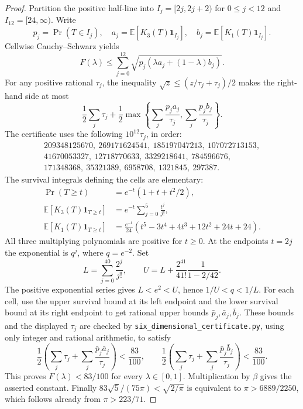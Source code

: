 \documentclass[11pt]{article}
\newcommand{\E}{\mathbb E}
\begin{document}
\begin{proof}
Partition the positive half-line into $I_j=[2j,2j+2)$ for $0\leq j<12$
and $I_{12}=[24,\infty)$. Write
\[
 p_j=\Pr(T\in I_j),\quad
 a_j=\E[K_3(T)\mathbf1_{I_j}],\quad
 b_j=\E[K_1(T)\mathbf1_{I_j}].
\]
Cellwise Cauchy--Schwarz yields
\[
 F(\lambda)\leq\sum_{j=0}^{12}
    \sqrt{p_j(\lambda a_j+(1-\lambda)b_j)}.
\]
For any positive rational $\tau_j$, the inequality
$\sqrt z\leq(z/\tau_j+\tau_j)/2$ makes the right-hand side at most
\[
 \frac12\sum_j\tau_j+
 \frac12\max\left\{\sum_j\frac{p_ja_j}{\tau_j},
                       \sum_j\frac{p_jb_j}{\tau_j}\right\}.
\]
The certificate uses the following $10^{12}\tau_j$, in order:
\[
\begin{gathered}
209348125670,\ 269171624541,\ 185197047213,\ 107072713153,\\
41670053327,\ 12718770633,\ 3329218641,\ 784596676,\\
171348368,\ 35321389,\ 6958708,\ 1321845,\ 297387.
\end{gathered}
\]
The survival integrals defining the cells are elementary:
\begin{align*}
 \Pr(T\geq t)&=e^{-t}(1+t+t^2/2),\\
 \E[K_3(T)\mathbf1_{T\geq t}]
 &=e^{-t}\sum_{j=0}^{5}\frac{t^j}{j!},\\
 \E[K_1(T)\mathbf1_{T\geq t}]
 &=\frac{e^{-t}}{24}
 (t^5-3t^4+4t^3+12t^2+24t+24).
\end{align*}
All three multiplying polynomials are positive for $t\geq0$.
At the endpoints $t=2j$ the exponential is $q^j$, where $q=e^{-2}$.
Set
\[
 L=\sum_{j=0}^{40}\frac{2^j}{j!},\qquad
 U=L+\frac{2^{41}}{41!}\frac1{1-2/42}.
\]
The positive exponential series gives $L<e^2<U$, hence $1/U<q<1/L$.
For each cell, use the upper survival bound at its left endpoint and the
lower survival bound at its right endpoint to get rational upper bounds
$\bar p_j,\bar a_j,\bar b_j$. These bounds and the displayed $\tau_j$ are
checked by \texttt{six\_dimensional\_certificate.py}, using only integer
and rational arithmetic, to satisfy
\[
 \frac12\left(\sum_j\tau_j+\sum_j\frac{\bar p_j\bar a_j}{\tau_j}\right)
 <\frac{83}{100},\qquad
 \frac12\left(\sum_j\tau_j+\sum_j\frac{\bar p_j\bar b_j}{\tau_j}\right)
 <\frac{83}{100}.
\]
This proves $F(\lambda)<83/100$ for every $\lambda\in[0,1]$.
Multiplication by $\beta$ gives the asserted constant.
Finally $83\sqrt5/(75\pi)<\sqrt{2/\pi}$ is equivalent to
$\pi>6889/2250$, which follows already from $\pi>223/71$.
\end{proof}
\end{document}
